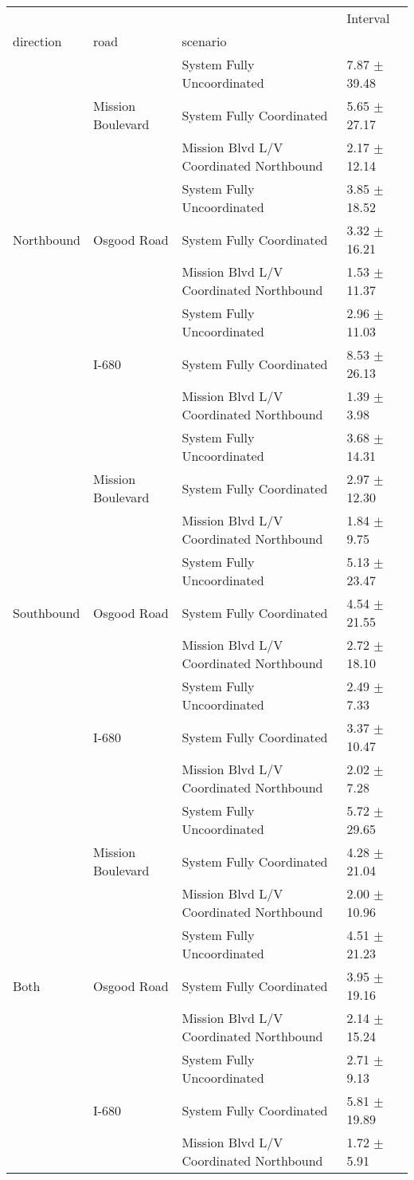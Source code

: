 \begin{tabular}{llll}
\toprule
 &  &  & Interval \\
direction & road & scenario &  \\
\midrule
\multirow[t]{9}{*}{Northbound} & \multirow[t]{3}{*}{Mission Boulevard} & System Fully Uncoordinated & 7.87 $\pm$ 39.48 \\
 &  & System Fully Coordinated & 5.65 $\pm$ 27.17 \\
 &  & Mission Blvd L/V Coordinated Northbound & 2.17 $\pm$ 12.14 \\
 & \multirow[t]{3}{*}{Osgood Road} & System Fully Uncoordinated & 3.85 $\pm$ 18.52 \\
 &  & System Fully Coordinated & 3.32 $\pm$ 16.21 \\
 &  & Mission Blvd L/V Coordinated Northbound & 1.53 $\pm$ 11.37 \\
 & \multirow[t]{3}{*}{I-680} & System Fully Uncoordinated & 2.96 $\pm$ 11.03 \\
 &  & System Fully Coordinated & 8.53 $\pm$ 26.13 \\
 &  & Mission Blvd L/V Coordinated Northbound & 1.39 $\pm$ 3.98 \\
\multirow[t]{9}{*}{Southbound} & \multirow[t]{3}{*}{Mission Boulevard} & System Fully Uncoordinated & 3.68 $\pm$ 14.31 \\
 &  & System Fully Coordinated & 2.97 $\pm$ 12.30 \\
 &  & Mission Blvd L/V Coordinated Northbound & 1.84 $\pm$ 9.75 \\
 & \multirow[t]{3}{*}{Osgood Road} & System Fully Uncoordinated & 5.13 $\pm$ 23.47 \\
 &  & System Fully Coordinated & 4.54 $\pm$ 21.55 \\
 &  & Mission Blvd L/V Coordinated Northbound & 2.72 $\pm$ 18.10 \\
 & \multirow[t]{3}{*}{I-680} & System Fully Uncoordinated & 2.49 $\pm$ 7.33 \\
 &  & System Fully Coordinated & 3.37 $\pm$ 10.47 \\
 &  & Mission Blvd L/V Coordinated Northbound & 2.02 $\pm$ 7.28 \\
\multirow[t]{9}{*}{Both} & \multirow[t]{3}{*}{Mission Boulevard} & System Fully Uncoordinated & 5.72 $\pm$ 29.65 \\
 &  & System Fully Coordinated & 4.28 $\pm$ 21.04 \\
 &  & Mission Blvd L/V Coordinated Northbound & 2.00 $\pm$ 10.96 \\
 & \multirow[t]{3}{*}{Osgood Road} & System Fully Uncoordinated & 4.51 $\pm$ 21.23 \\
 &  & System Fully Coordinated & 3.95 $\pm$ 19.16 \\
 &  & Mission Blvd L/V Coordinated Northbound & 2.14 $\pm$ 15.24 \\
 & \multirow[t]{3}{*}{I-680} & System Fully Uncoordinated & 2.71 $\pm$ 9.13 \\
 &  & System Fully Coordinated & 5.81 $\pm$ 19.89 \\
 &  & Mission Blvd L/V Coordinated Northbound & 1.72 $\pm$ 5.91 \\
\bottomrule
\end{tabular}
